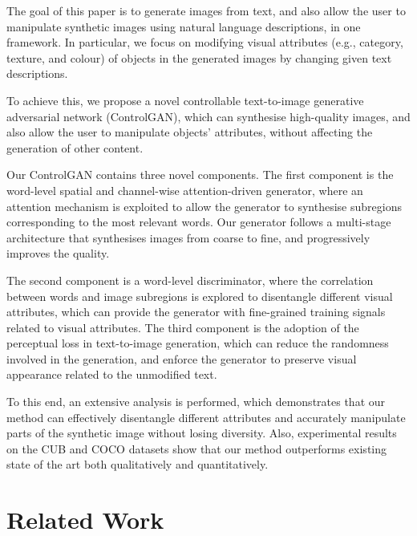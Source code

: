 The goal of this paper is to generate images from text, and also allow the user to manipulate synthetic images using natural language descriptions, in one framework. In particular, we focus on modifying visual attributes (e.g., category, texture, and colour) of objects in the generated images by changing given text descriptions.

To achieve this, we propose a novel controllable text-to-image generative adversarial network (ControlGAN), which can synthesise high-quality images, and also allow the user to manipulate objects' attributes, without affecting the generation of other content.

Our ControlGAN contains three novel components. The first component is the word-level spatial and channel-wise attention-driven generator, where an attention mechanism is exploited to allow the generator to synthesise subregions corresponding to the most relevant words. Our generator follows a multi-stage architecture \cite{xu2018attngan, zhang2018stackgan++} that synthesises images from coarse to fine, and progressively improves the quality. 

The second component is a word-level discriminator, where the correlation between words and image subregions is explored to disentangle different visual attributes, {which} can provide the generator with fine-grained training signals related to visual attributes. The third component is the adoption of the perceptual loss \cite{johnson2016perceptual} in text-to-image generation, which can reduce the randomness involved in the generation, and enforce the generator to preserve visual appearance related to the unmodified text. 

To this end, an extensive analysis is performed, which demonstrates that our method can effectively disentangle different attributes and accurately manipulate parts of the synthetic image without losing diversity. Also, experimental results on the CUB \cite{wah2011caltech} and COCO \cite{lin2014microsoft} datasets show that our method outperforms existing state of the art both qualitatively and quantitatively.

\section{Related Work}
\label{rel_work}
